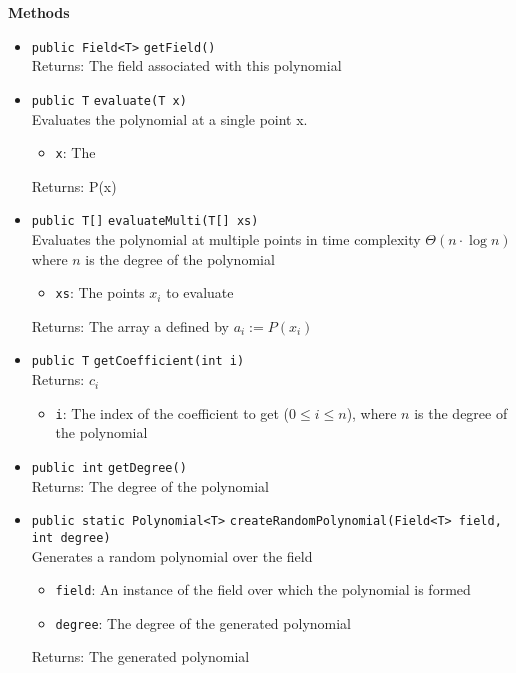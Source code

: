 \textbf{Methods}
\begin{itemize}
\item \lstinline|public Field<T>| \lstinline|getField|\lstinline|()|\\
Returns: The field associated with this polynomial



\item \lstinline|public T| \lstinline|evaluate|\lstinline|(T x)|\\
Evaluates the polynomial at a single point x.
\begin{itemize}
\item \lstinline|x|: The
\end{itemize}

Returns: P(x)

\item \lstinline|public T[]| \lstinline|evaluateMulti|\lstinline|(T[] xs)|\\
Evaluates the polynomial at multiple points in time complexity $\Theta(n\cdot\log
 n)$ where $n$ is the degree of the polynomial
\begin{itemize}
\item \lstinline|xs|: The points $x_i$ to evaluate
\end{itemize}

Returns: The array a defined by $a_i := P(x_i)$

\item \lstinline|public T| \lstinline|getCoefficient|\lstinline|(int i)|\\
Returns: $c_i$
\begin{itemize}
\item \lstinline|i|: The index of the coefficient to get ($0 \leq i \leq n$), where
          $n$ is the degree of the polynomial
\end{itemize}



\item \lstinline|public int| \lstinline|getDegree|\lstinline|()|\\
Returns: The degree of the polynomial



\item \lstinline|public static Polynomial<T>| \lstinline|createRandomPolynomial|\lstinline|(Field<T> field, int degree)|\\
Generates a random polynomial over the field
\begin{itemize}
\item \lstinline|field|: An instance of the field over which the polynomial is formed
\item \lstinline|degree|: The degree of the generated polynomial
\end{itemize}

Returns: The generated polynomial

\end{itemize}

